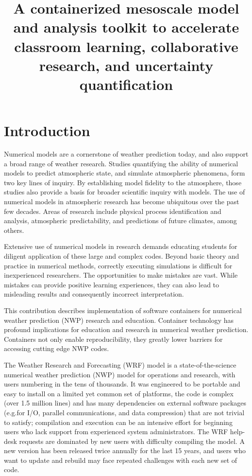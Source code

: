 \documentclass[final]{ametsoc}
\title{A containerized mesoscale model and analysis toolkit to accelerate classroom learning,
collaborative research, and uncertainty quantification}
\affiliation{Research Applications Laboratory, National Center for Atmospheric Research, Boulder, CO.}
\begin{document}
\maketitle


%

\section{Introduction}

Numerical models are a cornerstone of weather prediction today, and also support a broad range of weather research. Studies quantifying the ability of numerical models to predict atmospheric state, and simulate atmospheric phenomena, form two key lines of inquiry. By establishing model fidelity to the atmosphere, those studies also provide a basis for broader scientific inquiry with models. The use of numerical models in atmospheric research has become ubiquitous over the past few decades. Areas of research include physical process identification and analysis, atmospheric predictability, and predictions of future climates, among others.  

Extensive use of numerical models in research demands educating students for diligent application of these large and complex codes. Beyond basic theory and practice in numerical methods, correctly executing simulations is difficult for inexperienced researchers. The opportunities to make mistakes are vast.  While mistakes can provide positive learning experiences, they can also lead to misleading results and consequently incorrect interpretation.  

This contribution describes implementation of software containers for numerical weather prediction (NWP) research and education. Container technology has profound implications for education and research in numerical weather prediction. Containers not only enable reproducibility, they greatly lower barriers for accessing cutting edge NWP codes. 

The Weather Research and Forecasting (WRF) model \citep{Skamarock:08} is a state-of-the-science numerical weather prediction (NWP) model for operations and research, with users numbering in the tens of thousands. It was engineered to be portable and easy to install on a limited yet common set of platforms, the code is complex (over 1.5 million lines) and has many dependencies on external software packages (e.g.\@ for I/O, parallel communications, and data compression) that are not trivial to satisfy; compilation and execution can be an intensive effort for beginning users who lack support from experienced system administrators. The WRF help-desk requests are dominated by new users with difficulty compiling the model. A new version has been released twice annually for the last 15 years, and users who want to update and rebuild may face repeated challenges with each new set of code. 
\end{document}
